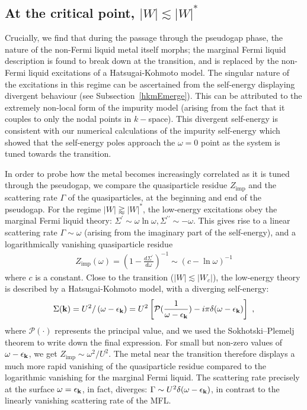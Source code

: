 \documentclass[reprint,hidelinks,onecolumn]{revtex4-2}
\begin{document}
\subsection{At the critical point, \(|W| \lesssim |W|^*\)}
Crucially, we find that during the passage through the pseudogap phase, the nature of the non-Fermi liquid metal itself morphs; the marginal Fermi liquid description is found to break down at the transition, and is replaced by the non-Fermi liquid excitations of a Hatsugai-Kohmoto model. The singular nature of the excitations in this regime can be ascertained from the self-energy displaying divergent behaviour (see Subsection~\ref{hkmEmerge}). This can be attributed to the extremely non-local form of the impurity model (arising from the fact that it couples to only the nodal points in \(k-\)space). This divergent self-energy is consistent with our numerical calculations of the impurity self-energy which showed that the self-energy poles approach the \(\omega=0\) point as the system is tuned towards the transition.

In order to probe how the metal becomes increasingly correlated as it is tuned through the pseudogap, we compare the quasiparticle residue \(Z_\text{imp}\) and the scattering rate \(\Gamma\) of the quasiparticles, at the beginning and end of the pseudogap. For the regime \(|W| \gtrapprox |W|^*\), the low-energy excitations obey the marginal Fermi liquid theory: \(\Sigma^{\prime} \sim \omega\ln\omega, \Sigma^{\prime\prime}\sim-\omega\). This gives rise to a linear scattering rate \(\Gamma \sim \omega\) (arising from the imaginary part of the self-energy), and a logarithmically vanishing quasiparticle residue~\cite{varma2002singular}
\begin{equation}\begin{aligned}
Z_\text{imp}(\omega) = (1 - \frac{d\Sigma^\prime}{d\omega})^{-1} \sim (c - \ln \omega)^{-1}
\end{aligned}\end{equation}
where \(c\) is a constant. Close to the transition (\(|W| \lesssim |W_c|\)), the low-energy theory is described by a Hatsugai-Kohmoto model, with a diverging self-energy: 
\begin{equation}\begin{aligned}
	\Sigma({\bf k}) = U^2/\left(\omega - \epsilon_{\bf k}\right) = U^2 \left[\mathcal{P}(\frac{1}{\omega - \epsilon_{\bf k}}) - i\pi \delta(\omega - \epsilon_{\bf k})\right]~,
\end{aligned}\end{equation}
where \(\mathcal{P}\left(\cdot\right)\) represents the principal value, and we used the Sokhotski–Plemelj theorem to write down the final expression. For small but non-zero values of \(\omega - \epsilon_{\bf k}\), we get \(Z_\text{imp} \sim \omega^2/U^2 \). The metal near the transition therefore displays a much more rapid vanishing of the quasiparticle residue compared to the logarithmic vanishing for the marginal Fermi liquid. The scattering rate precisely at the surface \(\omega=\epsilon_{\bf k}\), in fact, diverges: \(\Gamma \sim U^2\delta(\omega - \epsilon_{\bf k})\), in contrast to the linearly vanishing scattering rate of the MFL.
\end{document}
